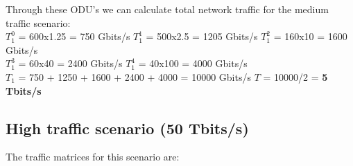 \vspace{17pt}
Through these ODU's we can calculate total network traffic for the medium traffic scenario:\\

$T_1^0$ = 600x1.25 = 750 Gbits/s \quad
$T_1^1$ = 500x2.5 = 1205 Gbits/s \quad
$T_1^2$ = 160x10 = 1600 Gbits/s \\

$T_1^3$ = 60x40 = 2400 Gbits/s \quad
$T_1^4$ = 40x100 = 4000 Gbits/s \\

$T_{1}$ = 750 + 1250 + 1600 + 2400 + 4000 = 10000 Gbits/s \qquad
$T$ = 10000/2 = \textbf{5 Tbits/s}\\

\subsection{High traffic scenario (50 Tbits/s)}\label{high_traffic_scenario}

The traffic matrices for this scenario are:

